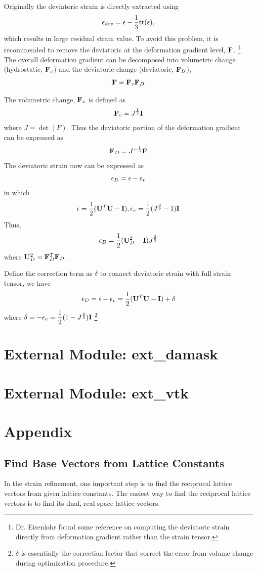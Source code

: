\documentclass[12pt]{scrartcl}
\begin{document}
\begin{enumerate}
Originally the deviatoric strain is directly extracted using 
\[
	\mathbf{\epsilon}_{dev} = \mathbf{\epsilon} - \dfrac{1}{3}\text{tr}(\mathbf{\epsilon}),
\]
which results in large residual strain value. 
To avoid this problem, it is recommended to remove the deviatoric at the deformation gradient level, $\mathbf{F}$.
\footnote{%
Dr. Eisenlohr found some reference on computing the deviatoric strain directly from deformation gradient rather than the strain tensor.
}
The overall deformation gradient can be decomposed into volumetric change (hydrostatic, $\mathbf{F}_v$) and the deviatoric change (deviatoric, $\mathbf{F}_D$),
\[ 
	\mathbf{F} = \mathbf{F}_v \mathbf{F}_D
\]

The volumetric change, $\mathbf{F}_v$ is defined as 
\[
	\mathbf{F}_v = J^{\frac{1}{3}} \mathbf{I}
\]
where $J = \det (F)$.
Thus the deviatoric portion of the deformation gradient can be expressed as 
\[
	\mathbf{F}_D = J^{-\frac{1}{3}} \mathbf{F}
\]
The deviatoric strain now can be expressed as 
\[
	\mathbf{\epsilon}_D = \mathbf{\epsilon} - \mathbf{\epsilon}_v
\]
in which 
\[
	\mathbf{\epsilon} = \dfrac{1}{2} (\mathbf{U}^T\mathbf{U} - \mathbf{I}), 
	\mathbf{\epsilon}_v = \dfrac{1}{2} (J^{\frac{2}{3}} - 1)\mathbf{I}
\]
Thus,
\[
	\mathbf{\epsilon}_D = \dfrac{1}{2} ( \mathbf{U}_D^2- \mathbf{I}) J^{\frac{2}{3}}
\]
where $\mathbf{U}_D^2 = \mathbf{F}_D^T \mathbf{F}_D$.

Define the correction term as $\delta$ to connect deviatoric strain with full strain tensor, we have
\[
	\mathbf{\epsilon}_D = \mathbf{\epsilon} - \mathbf{\epsilon}_v 
	                          = \dfrac{1}{2} (\mathbf{U}^T\mathbf{U} - \mathbf{I}) + \delta
\]
where $\delta = -\epsilon_v = \dfrac{1}{2} (1 - J^{\frac{2}{3}})\mathbf{I}$
\footnote{%
$\delta$ is essentially the correction factor that correct the error from volume change during optimization procedure.
}

\end{enumerate}


\section{External Module: ext\_damask}

\section{External Module: ext\_vtk}

\section{Appendix}
\subsection{Find Base Vectors from Lattice Constants}
\label{sec:lc2bv}
In the strain refinement, one important step is to find the reciprocal lattice vectors from given lattice constants.
The easiest way to find the reciprocal lattice vectors is to find its dual, real space lattice vectors.
\end{document}
